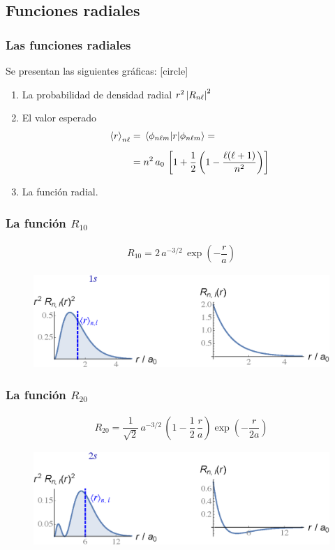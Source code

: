 \documentclass[12pt]{beamer}
\begin{document}
\subsection{Funciones radiales}

\begin{frame}
\frametitle{Las funciones radiales}
Se presentan las siguientes gráficas:
[circle]
\begin{enumerate}[<+->]
\item La probabilidad de densidad radial $r^{2} \, \abs{R_{n \ell}}^{2}$
\item El valor esperado
\begin{align*}
\expval{r}_{n \ell} &= \expval{r}{\phi_{n \ell m}} = \\[0.5em]
&= n^{2} \, a_{0} \, \left[ 1 + \dfrac{1}{2} \left( 1 - \dfrac{\ell (\ell + 1)}{n^{2}} \right) \right]
\end{align*}
\item La función radial.
\end{enumerate}
\end{frame}
\begin{frame}
\frametitle{La función $R_{10}$}
\begin{align*}
R_{10} = 2 \, a^{-3/2} \, \exp(-\dfrac{r}{a})
\end{align*}
\pause
\vspace*{-0.5cm}
\begin{figure}
   \centering
   \includegraphics[scale=0.65]{Imagenes/Plot_Funcion_Radial_10.eps}
\end{figure}
\end{frame}
\begin{frame}
\frametitle{La función $R_{20}$}
\begin{align*}
R_{20} = \dfrac{1}{\sqrt{2}} \, a^{-3/2} \, \left( 1 - \dfrac{1}{2} \, \dfrac{r}{a} \right)\exp(-\dfrac{r}{2a})
\end{align*}
\pause
\vspace*{-0.5cm}
\begin{figure}
   \centering
   \includegraphics[scale=0.67]{Imagenes/Plot_Funcion_Radial_20.eps}
\end{figure}
\end{frame}
\end{document}

